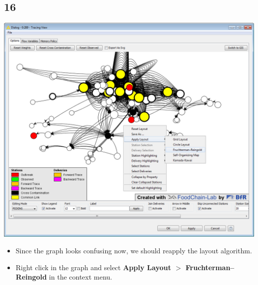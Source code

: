 \documentclass{beamer}
\begin{document}
\subsection{16}
\begin{frame}
	\begin{center}
  		\includegraphics[height=0.6\textheight]{16.png}
	\end{center}
	\begin{itemize}
		\item Since the graph looks confusing now, we should reapply the layout algorithm.
		\item Right click in the graph and select \textbf{Apply Layout $>$ Fruchterman–Reingold} in the context menu.
	\end{itemize}
\end{frame}
\end{document}
